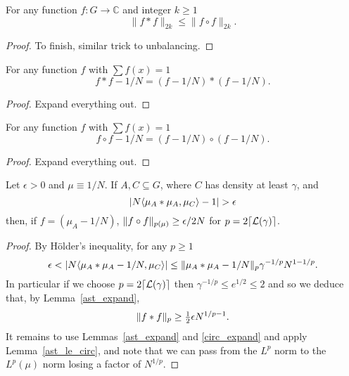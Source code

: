 \begin{lemma}
\label{ast_le_circ}
\leanok
For any function $f:G\to \mathbb{C}$ and integer $k\geq 1$
\[\| f\ast f\|_{2k}\leq \| f\circ f\|_{2k}.\]
\end{lemma}

\begin{proof}
To finish, similar trick to unbalancing.
\end{proof}


\begin{lemma}\label{ast_expand}
\leanok
For any function $f$ with $\sum f(x)=1$
\[f\ast f-1/N = (f-1/N)\ast (f-1/N).\]
\end{lemma}

\begin{proof}
\leanok
Expand everything out.
\end{proof}


\begin{lemma}\label{circ_expand}
\leanok
For any function $f$ with $\sum f(x)=1$
\[f\circ f-1/N = (f-1/N)\circ (f-1/N).\]
\end{lemma}

\begin{proof}
\leanok
Expand everything out.
\end{proof}


\begin{lemma}
\label{global_dichotomy}
\leanok
Let $\epsilon >0$ and $\mu\equiv 1/N$. If $A,C\subseteq G$, where $C$ has density at least $\gamma$, and
\[\left\lvert N\langle \mu_A\ast \mu_A,\mu_C\rangle -1\right\rvert>\epsilon\]
then, if $f=(\mu_A-1/N)$, $\lVert f\circ f\rVert_{p(\mu)} \geq \epsilon /2N$ for $p=2\lceil \mathcal{L}{(}\gamma)\rceil$.
\end{lemma}

\begin{proof}
\leanok
By H\"{o}lder's inequality, for any $p\geq 1$
\[\epsilon < \left\lvert  N\langle \mu_A \ast \mu_A - 1/N, \mu_C \rangle \right\rvert \leq \lVert \mu_A\ast \mu_A-1/N\rVert_p\gamma^{-1/p}N^{1-1/p}.\]
In particular if we choose $p=2\lceil\mathcal{L}{(}\gamma)\rceil$ then $\gamma^{-1/p}\leq e^{1/2}\leq 2$ and so we deduce that, by Lemma~\ref{ast_expand},
\[\lVert f\ast f\rVert_{p}\geq \tfrac{1}{2}\epsilon N^{1/p-1}.\]
It remains to use Lemmas~\ref{ast_expand} and \ref{circ_expand} and apply Lemma~\ref{ast_le_circ}, and note that we can pass from the $L^p$ norm to the $L^p(\mu)$ norm losing a factor of $N^{1/p}$.
\end{proof}


